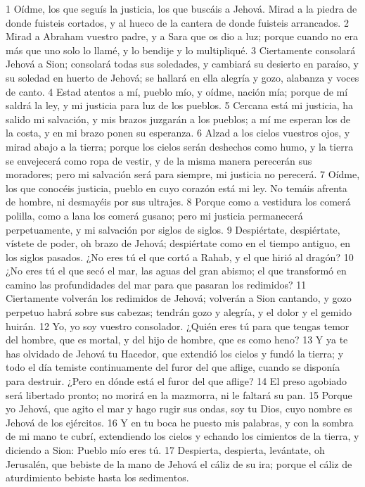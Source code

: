 1 Oídme, los que seguís la justicia, los que buscáis a Jehová. Mirad a la piedra de donde fuisteis cortados, y al hueco de la cantera de donde fuisteis arrancados.
2 Mirad a Abraham vuestro padre, y a Sara que os dio a luz; porque cuando no era más que uno solo lo llamé, y lo bendije y lo multipliqué.
3 Ciertamente consolará Jehová a Sion; consolará todas sus soledades, y cambiará su desierto en paraíso, y su soledad en huerto de Jehová; se hallará en ella alegría y gozo, alabanza y voces de canto.
4 Estad atentos a mí, pueblo mío, y oídme, nación mía; porque de mí saldrá la ley, y mi justicia para luz de los pueblos.
5 Cercana está mi justicia, ha salido mi salvación, y mis brazos juzgarán a los pueblos; a mí me esperan los de la costa, y en mi brazo ponen su esperanza.
6 Alzad a los cielos vuestros ojos, y mirad abajo a la tierra; porque los cielos serán deshechos como humo, y la tierra se envejecerá como ropa de vestir, y de la misma manera perecerán sus moradores; pero mi salvación será para siempre, mi justicia no perecerá.
7 Oídme, los que conocéis justicia, pueblo en cuyo corazón está mi ley. No temáis afrenta de hombre, ni desmayéis por sus ultrajes.
8 Porque como a vestidura los comerá polilla, como a lana los comerá gusano; pero mi justicia permanecerá perpetuamente, y mi salvación por siglos de siglos.
9 Despiértate, despiértate, vístete de poder, oh brazo de Jehová; despiértate como en el tiempo antiguo, en los siglos pasados. ¿No eres tú el que cortó a Rahab, y el que hirió al dragón?
10 ¿No eres tú el que secó el mar, las aguas del gran abismo; el que transformó en camino las profundidades del mar para que pasaran los redimidos?
11 Ciertamente volverán los redimidos de Jehová; volverán a Sion cantando, y gozo perpetuo habrá sobre sus cabezas; tendrán gozo y alegría, y el dolor y el gemido huirán.
12 Yo, yo soy vuestro consolador. ¿Quién eres tú para que tengas temor del hombre, que es mortal, y del hijo de hombre, que es como heno?
13 Y ya te has olvidado de Jehová tu Hacedor, que extendió los cielos y fundó la tierra; y todo el día temiste continuamente del furor del que aflige, cuando se disponía para destruir. ¿Pero en dónde está el furor del que aflige?
14 El preso agobiado será libertado pronto; no morirá en la mazmorra, ni le faltará su pan.
15 Porque yo Jehová, que agito el mar y hago rugir sus ondas, soy tu Dios, cuyo nombre es Jehová de los ejércitos.
16 Y en tu boca he puesto mis palabras, y con la sombra de mi mano te cubrí, extendiendo los cielos y echando los cimientos de la tierra, y diciendo a Sion: Pueblo mío eres tú.
17 Despierta, despierta, levántate, oh Jerusalén, que bebiste de la mano de Jehová el cáliz de su ira; porque el cáliz de aturdimiento bebiste hasta los sedimentos.
